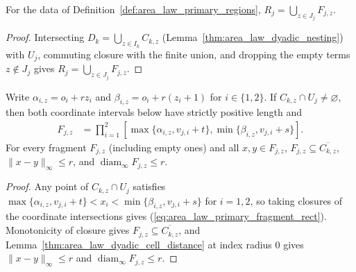 \begin{lemma}
    \label{thm:area_law_primary_fragment_union}
    \leanok
    For the data of Definition~\ref{def:area_law_primary_regions},
    $R_j=\bigcup_{z\in J_j}F_{j,z}$.
\end{lemma}
\begin{proof}\leanok
    Intersecting $D_k=\bigcup_{z\in I_k}C_{k,z}$
    (Lemma~\ref{thm:area_law_dyadic_nesting}) with $U_j$, commuting closure
    with the finite union, and dropping the empty terms $z\notin J_j$ gives
    $R_j=\bigcup_{z\in J_j}F_{j,z}$.
\end{proof}

\begin{lemma}
    \label{thm:area_law_primary_fragment_rectangles}
    \leanok
    Write $\alpha_{i,z}=o_i+rz_i$ and $\beta_{i,z}=o_i+r(z_i+1)$ for
    $i\in\{1,2\}$. If $C_{k,z}\cap U_j\ne\varnothing$, then both coordinate
    intervals below have strictly positive length and
    \begin{align}
        F_{j,z}
         & =\prod_{i=1}^2
        [\max\{\alpha_{i,z},v_{j,i}+t\},
        \min\{\beta_{i,z},v_{j,i}+s\}].
        \label{eq:area_law_primary_fragment_rect}
    \end{align}
    For every fragment $F_{j,z}$ (including empty ones) and all $x,y\in F_{j,z}$,
    $F_{j,z}\subseteq\overline{C_{k,z}}$, $\|x-y\|_\infty\le r$, and
    $\operatorname{diam}_\infty F_{j,z}\le r$.
\end{lemma}
\begin{proof}\leanok
    Any point of $C_{k,z}\cap U_j$ satisfies
    $\max\{\alpha_{i,z},v_{j,i}+t\}<x_i<\min\{\beta_{i,z},v_{j,i}+s\}$ for
    $i=1,2$, so taking closures of the coordinate intersections gives
    (\ref{eq:area_law_primary_fragment_rect}). Monotonicity of closure gives
    $F_{j,z}\subseteq\overline{C_{k,z}}$, and
    Lemma~\ref{thm:area_law_dyadic_cell_distance} at index radius $0$ gives
    $\|x-y\|_\infty\le r$ and $\operatorname{diam}_\infty F_{j,z}\le r$.
\end{proof}

